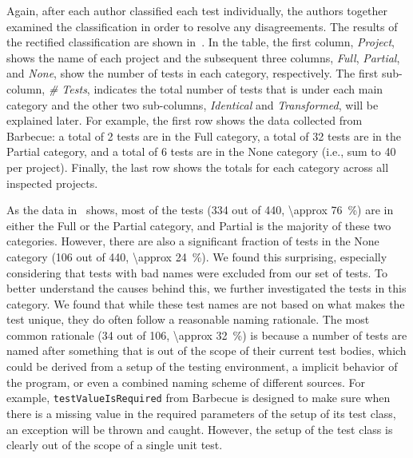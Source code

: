Again, after each author classified each test individually, the authors together examined the classification in order to resolve any disagreements.
%
The results of the rectified classification are shown in~.
%
In the table, the first column, \emph{Project}, shows the name of each project and the subsequent three columns, \emph{Full}, \emph{Partial}, and \emph{None}, show the number of tests in each category, respectively.
%
The first sub-column, \emph{\# Tests}, indicates the total number of tests that is under each main category and the other two sub-columns, \emph{Identical} and \emph{Transformed}, will be explained later.
%
For example, the first row shows the data collected from Barbecue: a total of \num{2} tests are in the Full category, a total of \num{32} tests are in the Partial category, and a total of \num{6} tests are in the None category (i.e., sum to \num{40} per project).
%
Finally, the last row shows the totals for each category across all inspected projects.


As the data in~ shows, most of the tests (\num{334} out of \num{440}, \SI{\approx 76}{\percent}) are in either the Full or the Partial category, and Partial is the majority of these two categories.
%
However, there are also a significant fraction of tests in the None category (\num{106} out of \num{440}, \SI{\approx 24}{\percent}).
%
We found this surprising, especially considering that tests with bad names were excluded from our set of tests.
%
To better understand the causes behind this, we further investigated the tests in this category.
%
We found that while these test names are not based on what makes the test unique, they do often follow a reasonable naming rationale.
%
The most common rationale (\num{34} out of \num{106}, \SI{\approx 32}{\percent}) is because a number of tests are named after something that is out of the scope of their current test bodies, which could be derived from a setup of the testing environment, a implicit behavior of the program, or even a combined naming scheme of different sources.
%
For example, \texttt{test\-Value\-Is\-Required} from Barbecue is designed to make sure when there is a missing value in the required parameters of the setup of its test class, an exception will be thrown and caught.
%
However, the setup of the test class is clearly out of the scope of a single unit test. 


